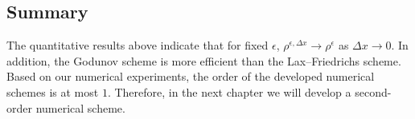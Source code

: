 \subsection*{Summary}
The quantitative results above indicate that for fixed $\epsilon$, $\rho^{\epsilon, \Delta x} \rightarrow \rho^{\epsilon} $ as $\Delta x \rightarrow 0$. In addition, the Godunov scheme is more efficient than the Lax--Friedrichs scheme. Based on our numerical experiments, the order of the developed numerical schemes is at most $1$. Therefore, in the next chapter we will develop a second-order numerical scheme.
